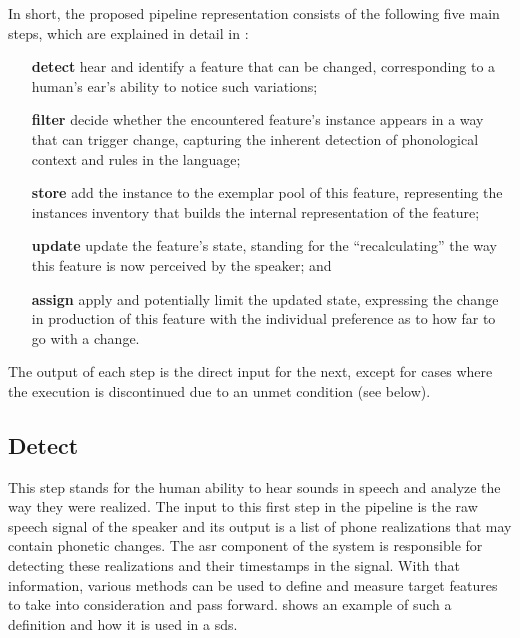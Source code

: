 In short, the proposed pipeline representation consists of the following five main steps, which are explained in detail in :
%
\begin{itemize}[topsep=0cm, itemsep=-.1cm, wide=0cm, leftmargin=!, labelwidth=]
	\item[\textbf{detect}] hear and identify a feature that can be changed, corresponding to a human's ear's ability to notice such variations;
	
	\item[\textbf{filter}] decide whether the encountered feature's instance appears in a way that can trigger change, capturing the inherent detection of phonological context and rules in the language;
	
	\item[\textbf{store}] add the instance to the exemplar pool of this feature, representing the instances inventory that builds the internal representation of the feature;
	
	\item[\textbf{update}] update the feature's state, standing for the \enquote{recalculating} the way this feature is now perceived by the speaker; and
	
	\item[\textbf{assign}] apply and potentially limit the updated state, expressing the change in production of this feature with the individual preference as to how far to go with a change.
\end{itemize}
%
The output of each step is the direct input for the next, except for cases where the execution is discontinued due to an unmet condition (see below).

\subsection{Detect}
\label{subsec:detect}

This step stands for the human ability to hear sounds in speech and analyze the way they were realized.
The input to this first step in the pipeline is the raw speech signal of the speaker and its output is a list of phone realizations that may contain phonetic changes.
The \ac{asr} component of the system is responsible for detecting these realizations and their timestamps in the signal.
With that information, various methods can be used to define and measure target features to take into consideration and pass forward.
 shows an example of such a definition and how it is used in a \ac{sds}.

